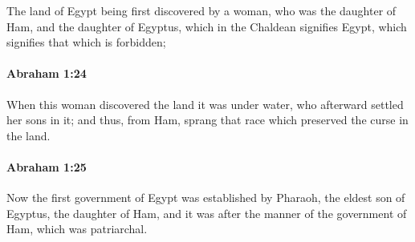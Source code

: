 			The land of Egypt being first discovered by a woman, who was the daughter of Ham, and the daughter of Egyptus, which in the Chaldean signifies Egypt, which signifies that which is forbidden;


		\paragraph{Abraham 1:24} %
			\label{ABRAHAM-1-24}

			When this woman discovered the land it was under water, who afterward settled her sons in it; and thus, from Ham, sprang that race which preserved the curse in the land.


		\paragraph{Abraham 1:25} %
			\label{ABRAHAM-1-25}

			Now the first government of Egypt was established by Pharaoh, the eldest son of Egyptus, the daughter of Ham, and it was after the manner of the government of Ham, which was patriarchal.

